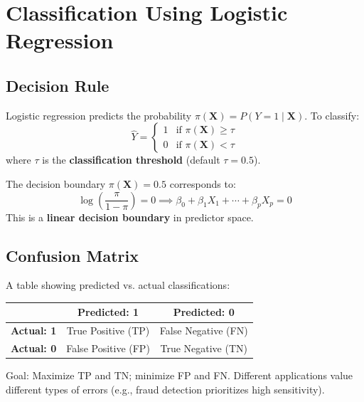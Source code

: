 \documentclass{article}
\begin{document}
\newpage
\section{Classification Using Logistic Regression}

\subsection{Decision Rule}
Logistic regression predicts the probability $\pi(\mathbf{X}) = P(Y = 1 \mid \mathbf{X})$. To classify:
$$\hat{Y} = \begin{cases} 1 & \text{if } \pi(\mathbf{X}) \ge \tau \\ 0 & \text{if } \pi(\mathbf{X}) < \tau \end{cases}$$
where $\tau$ is the \textbf{classification threshold} (default $\tau = 0.5$).

The decision boundary $\pi(\mathbf{X}) = 0.5$ corresponds to:
$$\log\left(\frac{\pi}{1 - \pi}\right) = 0 \implies \beta_0 + \beta_1 X_1 + \cdots + \beta_p X_p = 0$$
This is a \textbf{linear decision boundary} in predictor space.

\subsection{Confusion Matrix}
A table showing predicted vs. actual classifications:

\begin{table}[h]
\centering
\begin{tabular}{lcc}
\toprule
 & \textbf{Predicted: 1} & \textbf{Predicted: 0} \\
\midrule
\textbf{Actual: 1} & True Positive (TP) & False Negative (FN) \\
\textbf{Actual: 0} & False Positive (FP) & True Negative (TN) \\
\bottomrule
\end{tabular}
\end{table}

\noindent Goal: Maximize TP and TN; minimize FP and FN. Different applications value different types of errors (e.g., fraud detection prioritizes high sensitivity).
\end{document}
